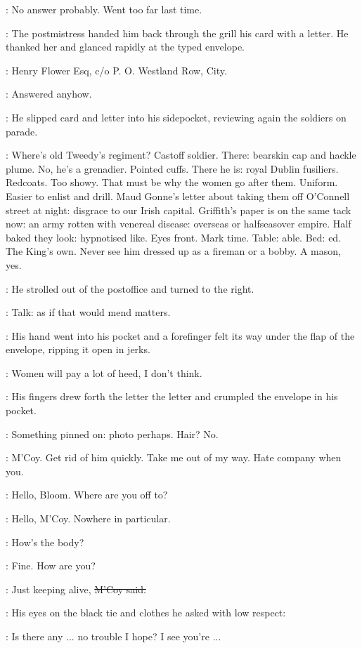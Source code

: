 \BloomInt:
No answer probably.
Went too far last time.

:
The postmistress handed him back through the grill
his card with a letter.
He thanked her and glanced rapidly at the typed envelope.

:
Henry Flower Esq,
c/o P. O. Westland Row,
City.

\BloomInt:
Answered anyhow.

:
He slipped card and letter into his sidepocket,
reviewing again the soldiers on parade.

\BloomInt:
Where's old Tweedy's regiment?
Castoff soldier.
There: bearskin cap and hackle plume.
No, he's a grenadier.
Pointed cuffs.
There he is: royal Dublin fusiliers.
Redcoats.
Too showy.
That must be why the women go after them.
Uniform.
Easier to enlist and drill.
Maud Gonne's letter about taking them off O'Connell street at night:
disgrace to our Irish capital.
Griffith's paper is on the same tack now:
an army rotten with venereal disease:
overseas or halfseasover empire.
Half baked they look:
hypnotised like.
Eyes front.
Mark time.
Table: able.
Bed: ed.
The King's own.
Never see him dressed up as a fireman or a bobby.
A mason, yes.


:
He strolled out of the postoffice and turned to the right.

\BloomInt:
Talk:
as if that would mend matters.

:
His hand went into his pocket
and a forefinger felt its way under the flap of the envelope,
ripping it open in jerks.

\BloomInt:
Women will pay a lot of heed, I don't think.

:
His fingers drew forth the letter
the letter and crumpled the envelope in his pocket.

\BloomInt:
Something pinned on:
photo perhaps.
Hair?
No.

\BloomInt:
M'Coy.
Get rid of him quickly.
Take me out of my way.
Hate company when you.

\mccoy:
Hello, Bloom.
Where are you off to?

\Bloom:
Hello, M'Coy.
Nowhere in particular.

\mccoy:
How's the body?

\Bloom:
Fine.
How are you?

\mccoy:
Just keeping alive,
\sout{M'Coy said.}

:
His eyes on the black tie and clothes
he asked with low respect:

\mccoy:
Is there any ... no trouble I hope?
I see you're ...

